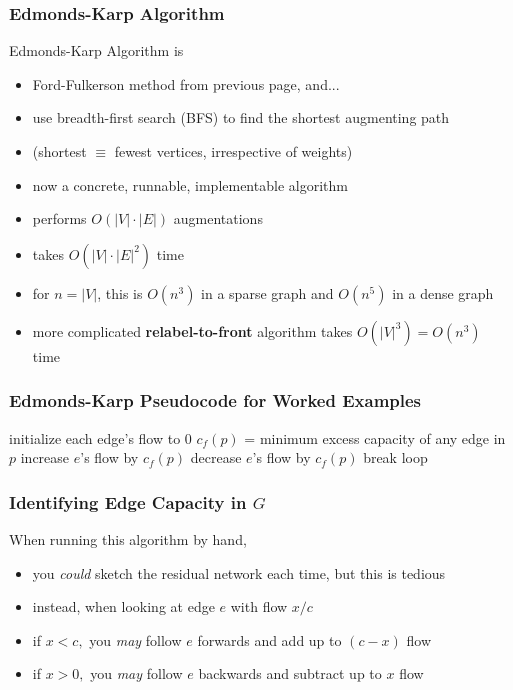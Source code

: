 \documentclass[10pt,aspectratio=169]{beamer}
\begin{document}
\begin{frame} \frametitle{Edmonds-Karp Algorithm}
Edmonds-Karp Algorithm is
\begin{itemize}
  \item Ford-Fulkerson method from previous page, and...
  \item use breadth-first search (BFS) to find the shortest augmenting path
  \item (shortest $\equiv$ fewest vertices, irrespective of weights)
  \item now a concrete, runnable, implementable algorithm
  \item performs $O(|V| \cdot |E|)$ augmentations
  \item takes $O(|V| \cdot |E|^2)$ time
  \item for $n=|V|$, this is $O(n^3)$ in a sparse graph and $O(n^5)$ in a dense graph
  \item more complicated \textbf{relabel-to-front} algorithm takes $O(|V|^3)=O(n^3)$
    time
\end{itemize}
\end{frame}

\begin{frame} \frametitle{Edmonds-Karp Pseudocode for Worked Examples}
  {\footnotesize
  \begin{algorithmic}[1]
    \State initialize each edge's flow to 0
    \Repeat
          \State $c_f(p)$ = minimum excess capacity of any edge in $p$
              \State increase $e$'s flow by $c_f(p)$
            \Else
              \State decrease $e$'s flow by $c_f(p)$
            \EndIf
          \EndFor
          \State break loop
        \EndIf
      \EndFor
    \State {}
    \EndFunction
  \end{algorithmic}
  }
\end{frame}

\begin{frame} \frametitle{Identifying Edge Capacity in $G$}
When running this algorithm by hand,
\begin{itemize}
  \item you \emph{could} sketch the residual network each time, but this is tedious
  \item instead, when looking at edge $e$ with flow $x/c$
  \item if $x<c,$ you \emph{may} follow $e$ forwards and add up to $(c-x)$ flow
  \item if $x>0,$ you \emph{may} follow $e$ backwards and subtract up to $x$ flow
\end{itemize}
\end{frame}
\end{document}
